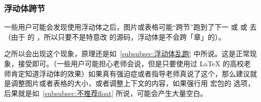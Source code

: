 \subsubsection{浮动体跨节}

一些用户可能会发现使用浮动体之后，图片或表格可能“跨节”跑到了下一  或  或  去（由于  的 ，所以只要不是特意改  的源码，浮动体是不会跨「章」的）。

之所以会出现这个现象，原理还是如~\ref{subsubsec:浮动体乱跑} 中所说。这是正常现象，接受即可。（一些用户可能担心老师会说，但是只要使用过 \LaTeX{} 的高校老师肯定知道浮动体的效果）如果真有强迫症或者指导老师真说了这个，那么建议就是调整图片或者表格的大小，或者调整上下文的内容，如果强行用  宏包的  选项，后果就是如~\ref{subsubsec:不推荐float} 所说，可能会产生大量空白。